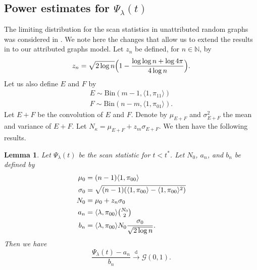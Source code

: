 \documentclass[10pt,journal,compsoc]{IEEEtran}
\newtheorem{lemma}[theorem]{Lemma}
\theoremstyle{definition}
\begin{document}
\subsection{Power estimates for $\Psi_{\lambda}(t)$}
\label{sec:power-estim-psi_l}
The limiting distribution for the scan statistics in unattributed
random graphs was considered in
\cite{rukhin:_limit_distr_graph_scan_statis}. We note here the changes
that allow us to extend the results in
\cite{rukhin:_limit_distr_graph_scan_statis} to our attributed graphs
model. Let $z_n$ be defined, for $n \in \mathbb{N}$, by
\begin{equation}
  \label{eq:20}
   z_n = \sqrt{2
      \log{n}}\Bigl(1 - \frac{\log{\log{n}} + \log{4 \pi}}{4
      \log{n}}\Bigr).
\end{equation}
Let us also define $E$ and $F$ by
\begin{gather*}
  E \sim \mathrm{Bin}(m-1, \langle 1, \pi_{11} \rangle) \\ F \sim \mathrm{Bin}(n-m,
  \langle 1, \pi_{01} \rangle).
\end{gather*}%
Let $E + F$ be the convolution of $E$ and $F$. Denote by $\mu_{E+F}$ and
$\sigma_{E+F}^{2}$ the mean and variance of $E + F$. Let
$N_{\kappa} = \mu_{E + F} + z_m \sigma_{E + F}$. We then have the
following results.
\begin{lemma}
  \label{lem:5}
  Let $\Psi_{\lambda}(t)$ be the scan statistic for $t < t^{*}$. Let
  $N_{0}$, $a_n$, and $b_n$ be defined by
\begin{align*}
   \mu_0 &= (n-1) \langle 1, \pi_{00} \rangle \\
   \sigma_0 &= \sqrt{(n-1) (\langle 1, \pi_{00} \rangle - \langle
     1, \pi_{00} \rangle^2)} \\ 
    N_{0} &= \mu_0 + z_n \sigma_0 \\
    a_n &=  \langle \lambda, \pi_{00} \rangle \tbinom{N_{0}}{2} \\ 
   b_n &= \langle \lambda, \pi_{00} \rangle N_{0} \frac{\sigma_0}{\sqrt{2 \log
     n}}.
\end{align*}
Then we have
\begin{equation}
  \frac{\Psi_{\lambda}(t) - a_{n}}{b_n}
  \overset{\mathrm{d}}{\longrightarrow}  \mathcal{G}(0, 1).
\end{equation}
\end{lemma}%
\end{document}
